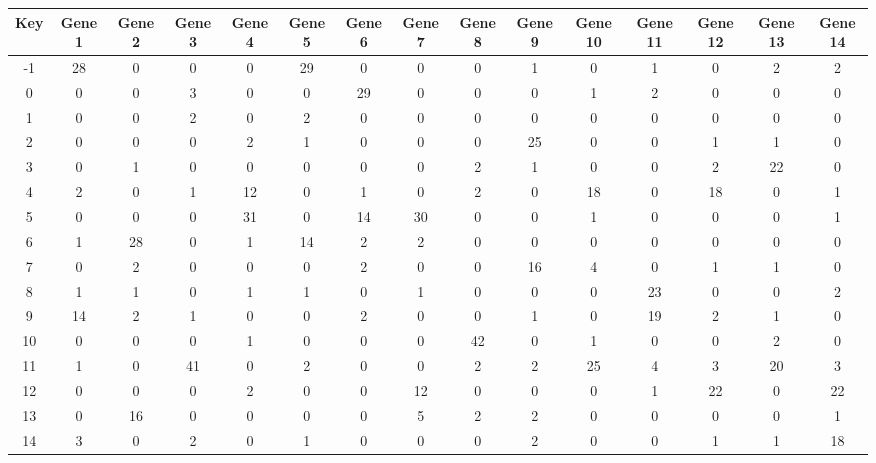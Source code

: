 \begin{tabular}{|c|c|c|c|c|c|c|c|c|c|c|c|c|c|c|}
\hline
Key & Gene 1 & Gene 2 & Gene 3 & Gene 4 & Gene 5 & Gene 6 & Gene 7 & Gene 8 & Gene 9 & Gene 10 & Gene 11 & Gene 12 & Gene 13 & Gene 14 \\
\hline
-1 & 28 & 0 & 0 & 0 & 29 & 0 & 0 & 0 & 1 & 0 & 1 & 0 & 2 & 2 \\
0 & 0 & 0 & 3 & 0 & 0 & 29 & 0 & 0 & 0 & 1 & 2 & 0 & 0 & 0 \\
1 & 0 & 0 & 2 & 0 & 2 & 0 & 0 & 0 & 0 & 0 & 0 & 0 & 0 & 0 \\
2 & 0 & 0 & 0 & 2 & 1 & 0 & 0 & 0 & 25 & 0 & 0 & 1 & 1 & 0 \\
3 & 0 & 1 & 0 & 0 & 0 & 0 & 0 & 2 & 1 & 0 & 0 & 2 & 22 & 0 \\
4 & 2 & 0 & 1 & 12 & 0 & 1 & 0 & 2 & 0 & 18 & 0 & 18 & 0 & 1 \\
5 & 0 & 0 & 0 & 31 & 0 & 14 & 30 & 0 & 0 & 1 & 0 & 0 & 0 & 1 \\
6 & 1 & 28 & 0 & 1 & 14 & 2 & 2 & 0 & 0 & 0 & 0 & 0 & 0 & 0 \\
7 & 0 & 2 & 0 & 0 & 0 & 2 & 0 & 0 & 16 & 4 & 0 & 1 & 1 & 0 \\
8 & 1 & 1 & 0 & 1 & 1 & 0 & 1 & 0 & 0 & 0 & 23 & 0 & 0 & 2 \\
9 & 14 & 2 & 1 & 0 & 0 & 2 & 0 & 0 & 1 & 0 & 19 & 2 & 1 & 0 \\
10 & 0 & 0 & 0 & 1 & 0 & 0 & 0 & 42 & 0 & 1 & 0 & 0 & 2 & 0 \\
11 & 1 & 0 & 41 & 0 & 2 & 0 & 0 & 2 & 2 & 25 & 4 & 3 & 20 & 3 \\
12 & 0 & 0 & 0 & 2 & 0 & 0 & 12 & 0 & 0 & 0 & 1 & 22 & 0 & 22 \\
13 & 0 & 16 & 0 & 0 & 0 & 0 & 5 & 2 & 2 & 0 & 0 & 0 & 0 & 1 \\
14 & 3 & 0 & 2 & 0 & 1 & 0 & 0 & 0 & 2 & 0 & 0 & 1 & 1 & 18 \\
\hline
\end{tabular}